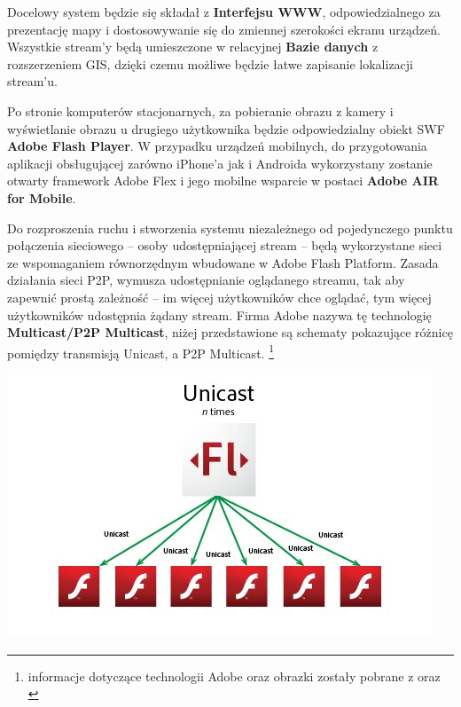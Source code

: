 Docelowy system będzie się składał z \textbf{Interfejsu WWW}, odpowiedzialnego za prezentację mapy i dostosowywanie się do zmiennej szerokości ekranu urządzeń. Wszystkie stream'y będą umieszczone w relacyjnej \textbf{Bazie danych} z rozszerzeniem GIS, dzięki czemu możliwe będzie łatwe zapisanie lokalizacji stream'u.

Po stronie komputerów stacjonarnych, za pobieranie obrazu z kamery i wyświetlanie obrazu u drugiego użytkownika będzie odpowiedzialny obiekt SWF \textbf{Adobe Flash Player}. W przypadku urządzeń mobilnych, do przygotowania aplikacji obsługującej zarówno iPhone'a jak i Androida wykorzystany zostanie otwarty framework Adobe Flex i jego mobilne wsparcie w postaci \textbf{Adobe AIR for Mobile}.

Do rozproszenia ruchu i stworzenia systemu niezależnego od pojedynczego punktu połączenia sieciowego -- osoby udostępniającej stream -- będą wykorzystane sieci ze wspomaganiem równorzędnym wbudowane w Adobe Flash Platform. Zasada działania sieci P2P, wymusza udostępnianie oglądanego streamu, tak aby zapewnić prostą zależność -- im więcej użytkowników chce oglądać, tym więcej użytkowników udostępnia żądany stream. Firma Adobe nazywa tę technologię \textbf{Multicast/P2P Multicast}, niżej przedstawione są schematy pokazujące różnicę pomiędzy transmisją Unicast, a P2P Multicast. \footnote{informacje dotyczące technologii Adobe oraz obrazki zostały pobrane z \cite{TomKrcha2010ME} oraz \cite{KevinTow2010}}

\begin{center}
    \includegraphics[width=\textwidth]{img/adobe-p2p-unicast.jpg}
\end{center}

